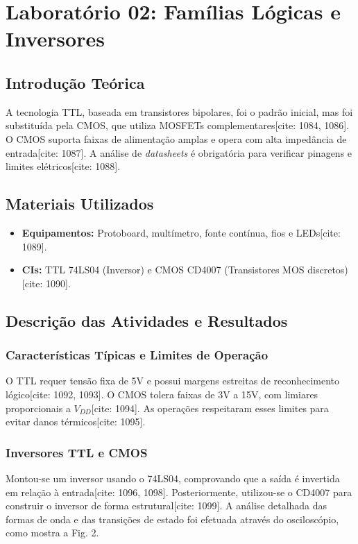 \documentclass[conference]{IEEEtran}
\begin{document}
\section{Laboratório 02: Famílias Lógicas e Inversores}

\subsection{Introdução Teórica}
A tecnologia TTL, baseada em transistores bipolares, foi o padrão inicial, mas foi substituída pela CMOS, que utiliza MOSFETs complementares[cite: 1084, 1086]. O CMOS suporta faixas de alimentação amplas e opera com alta impedância de entrada[cite: 1087]. A análise de \textit{datasheets} é obrigatória para verificar pinagens e limites elétricos[cite: 1088].

\subsection{Materiais Utilizados}
\begin{itemize}
    \item \textbf{Equipamentos:} Protoboard, multímetro, fonte contínua, fios e LEDs[cite: 1089].
    \item \textbf{CIs:} TTL 74LS04 (Inversor) e CMOS CD4007 (Transistores MOS discretos)[cite: 1090].
\end{itemize}

\subsection{Descrição das Atividades e Resultados}

\subsubsection{Características Típicas e Limites de Operação}
O TTL requer tensão fixa de 5V e possui margens estreitas de reconhecimento lógico[cite: 1092, 1093]. O CMOS tolera faixas de 3V a 15V, com limiares proporcionais a $V_{DD}$[cite: 1094]. As operações respeitaram esses limites para evitar danos térmicos[cite: 1095].

\subsubsection{Inversores TTL e CMOS}
Montou-se um inversor usando o 74LS04, comprovando que a saída é invertida em relação à entrada[cite: 1096, 1098]. Posteriormente, utilizou-se o CD4007 para construir o inversor de forma estrutural[cite: 1099]. A análise detalhada das formas de onda e das transições de estado foi efetuada através do osciloscópio, como mostra a Fig. 2.
\end{document}
